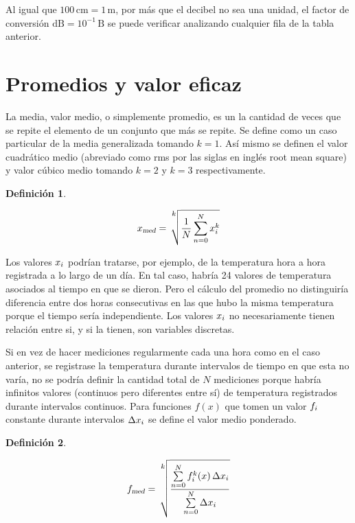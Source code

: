 \documentclass[a5paper,12pt,twoside]{book}
\newtheorem{defn}{{Definición}}[chapter]
\begin{document}
Al igual que $100\,\si{\centi\metre} = 1\,\si{\metre}$, por más que el decibel no sea una unidad, el factor de conversión $\si{\deci\bel} = 10^{-1} \,\si{\bel}$ se puede verificar analizando cualquier fila de la tabla anterior.


\section{Promedios y valor eficaz}

La media, valor medio, o simplemente promedio, es un la cantidad de veces que se repite el elemento de un conjunto que más se repite.
Se define como un caso particular de la media generalizada tomando $k=1$.
Así mismo se definen el valor cuadrático medio (abreviado como rms por las siglas en inglés root mean square) y valor cúbico medio tomando $k=2$ y $k=3$ respectivamente.

\begin{mdframed}[style=DefinitionFrame]
    \begin{defn}
    \end{defn}
    \begin{equation*}
        \sub{x}{med} = \sqrt[\uproot{20} \scriptstyle k]{ \frac{1}{N} \sum_{n=0}^{N} x_\ith^k }
    \end{equation*}
\end{mdframed}

Los valores $x_i$ podrían tratarse, por ejemplo, de la temperatura hora a hora registrada a lo largo de un día.
En tal caso, habría 24 valores de temperatura asociados al tiempo en que se dieron.
Pero el cálculo del promedio no distinguiría diferencia entre dos horas consecutivas en las que hubo la misma temperatura porque el tiempo sería independiente.
Los valores $x_i$ no necesariamente tienen relación entre si, y si la tienen, son variables discretas.

Si en vez de hacer mediciones regularmente cada una hora como en el caso anterior, se registrase la temperatura durante intervalos de tiempo en que esta no varía, no se podría definir la cantidad total de $N$ mediciones porque habría infinitos valores (continuos pero diferentes entre sí) de temperatura registrados durante intervalos continuos.
Para funciones $f(x)$ que tomen un valor $f_i$ constante durante intervalos $\Delta x_i$ se define el valor medio ponderado.

\begin{mdframed}[style=DefinitionFrame]
    \begin{defn}
    \end{defn}
    \begin{equation*}
        \sub{f}{med} = \sqrt[\uproot{36} \scriptstyle k]{ \frac{\sum\limits_{n=0}^{N} f_\ith^k(x) \, \Delta x_\ith}{\sum\limits_{n=0}^{N} \Delta x_\ith }}
    \end{equation*}
\end{mdframed}
\end{document}
